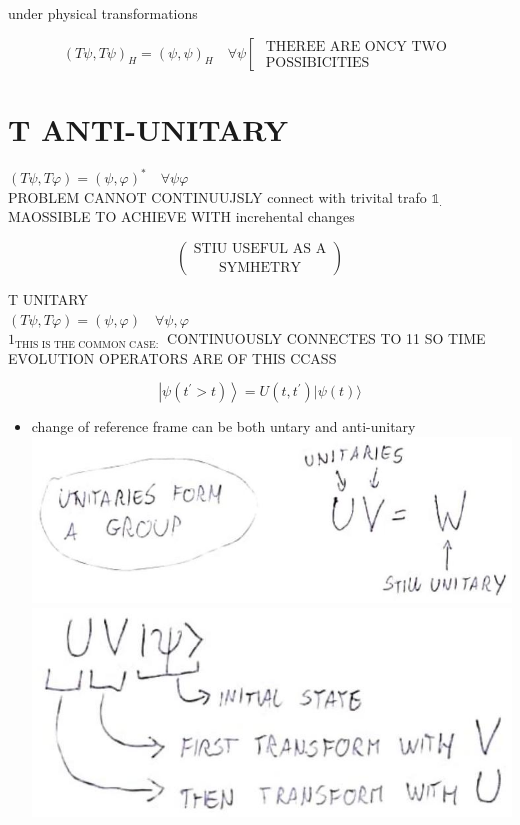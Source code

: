 \documentclass[10pt]{article}
\begin{document}
under physical transformations

$$
(T \psi, T \psi)_{H}=(\psi, \psi)_{H} \quad \forall \psi\left[\begin{array}{c}
\text { THEREE ARE ONCY TWO } \\
\text { POSSIBICITIES }
\end{array}\right.
$$

\section*{T ANTI-UNITARY}
$(T \psi, T \varphi)=(\psi, \varphi)^{*} \quad \forall \psi \varphi$\\
PROBLEM CANNOT CONTINUUJSLY connect with trivital trafo $\mathbb{1}_{.}$ MAOSSIBLE TO ACHIEVE WITH increhental changes

$$
\binom{\text { STIU USEFUL AS A }}{\text { SYMHETRY }}
$$

T UNITARY\\
$(T \psi, T \varphi)=(\psi, \varphi) \quad \forall \psi, \varphi$\\
$1_{\text {THIS IS THE COMMON CASE: }}$ CONTINUOUSLY CONNECTES TO 11 SO TIME EVOLUTION OPERATORS ARE OF THIS CCASS

$$
\left|\psi\left(t^{\prime}>t\right)\right\rangle=U\left(t, t^{\prime}\right)|\psi(t)\rangle
$$

\begin{itemize}
  \item change of reference frame can be both untary and anti-unitary\\
\includegraphics[max width=\textwidth, center]{2025_10_16_f02af6fa434c9f0bcc00g-08(1)}\\
\includegraphics[max width=\textwidth, center]{2025_10_16_f02af6fa434c9f0bcc00g-08(2)}
\end{itemize}
\end{document}

